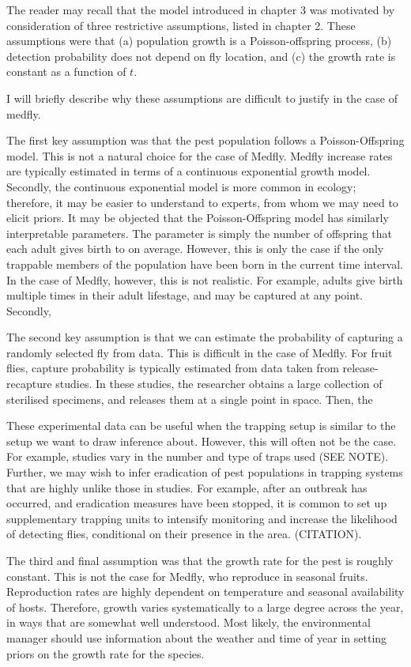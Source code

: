 \documentclass[
]{book}
\begin{document}
The reader may recall that the model introduced in chapter 3 was motivated by consideration of three restrictive assumptions, listed in chapter 2. These assumptions were that (a) population growth is a Poisson-offspring process, (b) detection probability does not depend on fly location, and (c) the growth rate is constant as a function of \(t\).

I will briefly describe why these assumptions are difficult to justify in the case of medfly.

The first key assumption was that the pest population follows a Poisson-Offspring model. This is not a natural choice for the case of Medfly. Medfly increase rates are typically estimated in terms of a continuous exponential growth model. Secondly, the continuous exponential model is more common in ecology; therefore, it may be easier to understand to experts, from whom we may need to elicit priors. It may be objected that the Poisson-Offspring model has similarly interpretable parameters. The parameter is simply the number of offspring that each adult gives birth to on average. However, this is only the case if the only trappable members of the population have been born in the current time interval. In the case of Medfly, however, this is not realistic. For example, adults give birth multiple times in their adult lifestage, and may be captured at any point. Secondly,

The second key assumption is that we can estimate the probability of capturing a randomly selected fly from data. This is difficult in the case of Medfly. For fruit flies, capture probability is typically estimated from data taken from release-recapture studies. In these studies, the researcher obtains a large collection of sterilised specimens, and releases them at a single point in space. Then, the

These experimental data can be useful when the trapping setup is similar to the setup we want to draw inference about. However, this will often not be the case. For example, studies vary in the number and type of traps used (SEE NOTE). Further, we may wish to infer eradication of pest populations in trapping systems that are highly unlike those in studies. For example, after an outbreak has occurred, and eradication measures have been stopped, it is common to set up supplementary trapping units to intensify monitoring and increase the likelihood of detecting flies, conditional on their presence in the area. (CITATION).

The third and final assumption was that the growth rate for the pest is roughly constant. This is not the case for Medfly, who reproduce in seasonal fruits. Reproduction rates are highly dependent on temperature and seasonal availability of hosts. Therefore, growth varies systematically to a large degree across the year, in ways that are somewhat well understood. Most likely, the environmental manager should use information about the weather and time of year in setting priors on the growth rate for the species.
\end{document}
